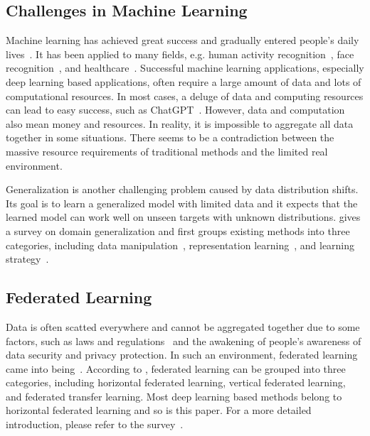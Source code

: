 \subsection{Challenges in Machine Learning}

Machine learning has achieved great success and gradually entered people's daily lives~\cite{Jindong-sarker2021machine, Jindong-paluru2021anam, Jindong-wang2019deep}.
It has been applied to many fields, e.g. human activity recognition~\cite{Jindong-lu2021cross}, face recognition~\cite{Jindong-liu2022sphereface}, and healthcare~\cite{Jindong-chen2022metafed}.
Successful machine learning applications, especially deep learning based applications, often require a large amount of data and lots of computational resources.
In most cases, a deluge of data and computing resources can lead to easy success, such as ChatGPT~\cite{Jindong-van2023chatgpt}.
However, data and computation also mean money and resources.
In reality, it is impossible to aggregate all data together in some situations.
There seems to be a contradiction between the massive resource requirements of traditional methods and the limited real environment. %

Generalization is another challenging problem caused by data distribution shifts.
Its goal is to learn a generalized model with limited data and it expects that the learned model can work well on unseen targets with unknown distributions.
\cite{Jindong-wang2022generalizing} gives a survey on domain generalization and first groups existing methods into three categories, including data manipulation~\cite{Jindong-lu2022semantic}, representation learning~\cite{Jindong-lu2022local}, and learning strategy~\cite{Jindong-huang2020self}.

\subsection{Federated Learning}
Data is often scatted everywhere and cannot be aggregated together due to some factors, such as laws and regulations~\cite{Jindong-voigt2017eu} and the awakening of people's awareness of data security and privacy protection.
In such an environment, federated learning came into being~\cite{Jindong-yang2019federated,Jindong-roy2019braintorrent}.
According to \cite{Jindong-yang2019federated}, federated learning can be grouped into three categories, including horizontal federated learning, vertical federated learning, and federated transfer learning.
Most deep learning based methods belong to horizontal federated learning and so is this paper.
For a more detailed introduction, please refer to the survey~\cite{Jindong-liu2022distributed}.

